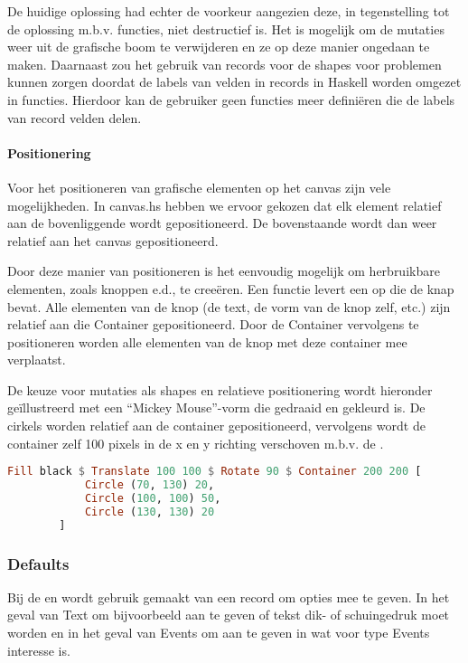 De huidige oplossing had echter de voorkeur aangezien deze, in tegenstelling tot de oplossing m.b.v. functies, niet destructief is. Het is mogelijk om de mutaties weer uit de grafische boom te verwijderen en ze op deze manier ongedaan te maken. Daarnaast zou het gebruik van records voor de shapes voor problemen kunnen zorgen doordat de labels van velden in records in Haskell worden omgezet in functies. Hierdoor kan de gebruiker geen functies meer defini\"eren die de labels van record velden delen.

\paragraph{Positionering}
Voor het positioneren van grafische elementen op het canvas zijn vele mogelijkheden. In canvas.hs hebben we ervoor gekozen dat elk element relatief aan de bovenliggende  wordt gepositioneerd. De bovenstaande  wordt dan weer relatief aan het canvas gepositioneerd. 

Door deze manier van positioneren is het eenvoudig mogelijk om herbruikbare elementen, zoals knoppen e.d., te creeëren. Een functie levert een  op die de knap bevat. Alle elementen van de knop (de text, de vorm van de knop zelf, etc.) zijn relatief aan die Container gepositioneerd. Door de Container vervolgens te positioneren worden alle elementen van de knop met deze container mee verplaatst. 

De keuze voor mutaties als shapes en relatieve positionering wordt hieronder geïllustreerd met een ``Mickey Mouse''-vorm die gedraaid en gekleurd is. De cirkels worden relatief aan de container gepositioneerd, vervolgens wordt de container zelf 100 pixels in de x en y richting verschoven m.b.v. de . 

\begin{lstlisting}[style=densecode, language=Haskell]
Fill black $ Translate 100 100 $ Rotate 90 $ Container 200 200 [
            Circle (70, 130) 20,
            Circle (100, 100) 50,
            Circle (130, 130) 20
        ]
\end{lstlisting}

\subsubsection{Defaults}
Bij de  en  wordt gebruik gemaakt van een record om opties mee te geven. In het geval van Text om bijvoorbeeld aan te geven of tekst dik- of schuingedruk moet worden en in het geval van Events om aan te geven in wat voor type Events interesse is. 


